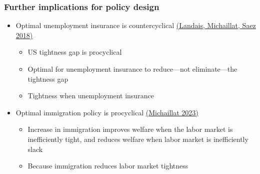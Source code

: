 \documentclass[11pt,aspectratio=169,xcolor={dvipsnames},hyperref={pdftex,pdfpagemode=UseNone,hidelinks,pdfdisplaydoctitle=true},usepdftitle=false]{beamer}
\begin{document}
\begin{frame}
\frametitle{Further implications for policy design}
\begin{itemize}
\item Optimal unemployment insurance is countercyclical \href{https://pascalmichaillat.org/4/}{(Landais, Michaillat, Saez 2018)}
\begin{itemize}
\item US tightness gap is procyclical	
\item Optimal for unemployment insurance to reduce---not eliminate---the tightness gap
\item Tightness \up when unemployment insurance \up
\end{itemize}
\item Optimal immigration policy is procyclical \href{https://pascalmichaillat.org/14/}{(Michaillat 2023)}
\begin{itemize}
\item Increase in immigration improves welfare when the labor market is inefficiently tight, and reduces welfare when labor market is inefficiently slack
\item Because immigration reduces labor market tightness
\end{itemize}
\end{itemize}	
\end{frame}
\end{document}
